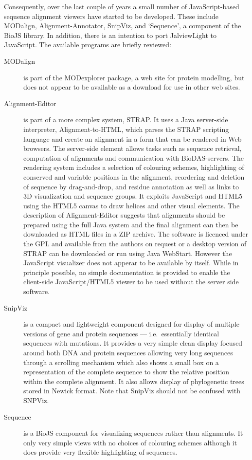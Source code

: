 \documentclass[a4]{article}
\begin{document}
Consequently, over the last couple of years a small number of
JavaScript-based sequence alignment viewers have started to be
developed. These include MODalign\cite{barbato:modalign},
Alignment-Annotator\cite{gille:2014aa}, SnipViz\cite{jaschob:2014},
and `Sequence'\cite{gomez:2014}, a component of the BioJS
library\cite{corpas:biojs}. In addition, there is an intention to port
JalviewLight to JavaScript.  The available programs are briefly
reviewed:

\begin{description}
\item[MODalign] is part of the MODexplorer
  package\cite{kosinski:2013}, a web site for protein modelling, but
  does not appear to be available as a download for use in other web
  sites.
\item[Alignment-Editor] is part of a more complex system, STRAP. It
  uses a Java server-side interpreter,
  Alignment-to-HTML\cite{gille:2014}, which parses the STRAP scripting
  language and create an alignment in a form that can be rendered in
  Web browsers. The server-side element allows tasks such as sequence
  retrieval, computation of alignments and communication with
  BioDAS-servers. The rendering system includes a selection of
  colouring schemes, highlighting of conserved and variable positions
  in the alignment, reordering and deletion of sequence by
  drag-and-drop, and residue annotation as well as links to 3D
  visualization and sequence groups. It exploits JavaScript and HTML5
  using the HTML5 canvas to draw helices and other visual elements.
  The description of Alignment-Editor\cite{gille:2014aa} suggests that
  alignments should be prepared using the full Java system and the
  final alignment can then be downloaded as HTML files in a ZIP
  archive. The software is licenced under the GPL and available from
  the authors on request or a desktop version of STRAP can be
  downloaded or run using Java WebStart. However the JavaScript
  visualizer does not apperar to be available by itself. While in
  principle possible, no simple documentation is provided to enable
  the client-side JavaScript/HTML5 viewer to be used without the
  server side software.
\item[SnipViz] is a compact and lightweight component designed for
  display of multiple versions of gene and protein sequences --- i.e.\
  essentially identical sequences with mutations.  It provides a very
  simple clean display focused around both DNA and protein sequences
  allowing very long sequences through a scrolling mechanism which
  also shows a small box on a representation of the complete sequence
  to show the relative position within the complete alignment.  It
  also allows display of phylogenetic trees stored in Newick
  format. Note that SnipViz should not be confused with
  SNPViz\cite{langewisch:snpviz}.
\item[Sequence] is a BioJS component for visualizing sequences rather
  than alignments.  It only very simple views with no choices of
  colouring schemes although it does provide very flexible
  highlighting of sequences.
\end{description}
\end{document}
